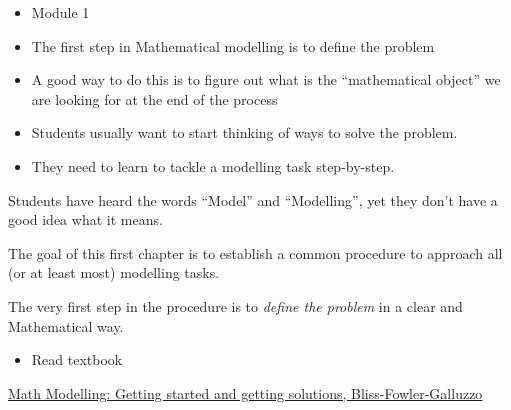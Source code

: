 \begin{lesson}

	
	\begin{itemize}
		\item Module 1
	\end{itemize}

	\begin{itemize}
		\item The first step in Mathematical modelling is to define the problem
		\item A good way to do this is to figure out what is the ``mathematical object'' we are looking for at the end of the process

	\end{itemize}
	

\begin{annotation}
\begin{notes}
\begin{itemize}
	\item Students usually want to start thinking of ways to solve the problem.
	
	\item They need to learn to tackle a modelling task step-by-step.
\end{itemize}
\end{notes}	
\end{annotation}

Students have heard the words ``Model'' and ``Modelling'', yet they don't have a good idea what it means. 

The goal of this first chapter is to establish a common procedure to approach all  (or at least most) modelling tasks. 

The very first step in the procedure is to \emph{define the problem} in a clear and Mathematical way.

\begin{itemize}
	\item Read textbook
\end{itemize}


\begin{annotation}
	\begin{goals}
	\end{goals}
\end{annotation}
	 \href{https://m3challenge.siam.org/resources/modeling-handbook}{Math Modelling: Getting started and getting solutions, Bliss-Fowler-Galluzzo}

\end{lesson}







